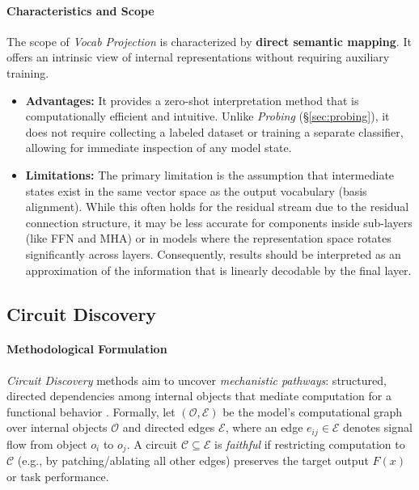 \documentclass[11pt,letterpaper]{mystyle}
\begin{document}
\paragraph{Characteristics and Scope}
The scope of \textit{Vocab Projection} is characterized by \textbf{direct semantic mapping}. It offers an intrinsic view of internal representations without requiring auxiliary training.
\begin{itemize}[leftmargin=*]
    \item \textbf{Advantages:} It provides a zero-shot interpretation method that is computationally efficient and intuitive. Unlike \textit{Probing} (\S\ref{sec:probing}), it does not require collecting a labeled dataset or training a separate classifier, allowing for immediate inspection of any model state.
    \item \textbf{Limitations:} The primary limitation is the assumption that intermediate states exist in the same vector space as the output vocabulary (basis alignment). While this often holds for the residual stream due to the residual connection structure, it may be less accurate for components inside sub-layers (like FFN and MHA) or in models where the representation space rotates significantly across layers. Consequently, results should be interpreted as an approximation of the information that is linearly decodable by the final layer.
\end{itemize}



\subsection{Circuit Discovery}
\label{sec:circuit_discovery}
\paragraph{Methodological Formulation}
\textit{Circuit Discovery} methods aim to uncover \textit{mechanistic pathways}: structured, directed dependencies among internal objects that mediate computation for a functional behavior \citep{elhage2021mathematical,olsson2022incontextlearninginductionheads,Hannacicuits_nips2023,yao2024circuits}.
Formally, let $(\mathcal{O},\mathcal{E})$ be the model’s computational graph over internal objects $\mathcal{O}$ and directed edges $\mathcal{E}$, where an edge $e_{ij}\in\mathcal{E}$ denotes signal flow from object $o_i$ to $o_j$.
A circuit $\mathcal{C}\subseteq\mathcal{E}$ is \emph{faithful} if restricting computation to $\mathcal{C}$ (e.g., by patching/ablating all other edges) preserves the target output $F(x)$ or task performance.
\end{document}
